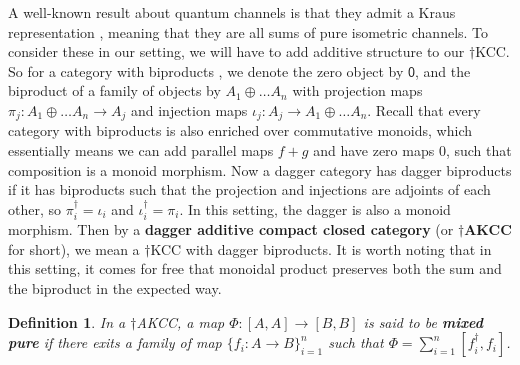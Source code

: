 \documentclass[submission,copyright,creativecommons]{eptcs}
\newtheorem{definition}[observation]{Definition}
\newtheorem{example}[observation]{Example}
\begin{document}
A well-known result about quantum channels is that they admit a Kraus representation \cite[Cor 2.27]{watrous2018theory}, meaning that they are all sums of pure isometric channels. To consider these in our setting, we will have to add additive structure to our $\dagger$KCC. So for a category with biproducts \cite[Sec 6.3]{selinger2010survey}, we denote the zero object by $\mathsf{0}$, and the biproduct of a family of objects by $A_1 \oplus \hdots A_n$ with projection maps $\pi_j: A_1 \oplus \hdots A_n \to A_j$ and injection maps $\iota_j: A_j \to A_1 \oplus \hdots A_n$. Recall that every category with biproducts is also enriched over commutative monoids, which essentially means we can add parallel maps $f+g$ and have zero maps $0$, such that composition is a monoid morphism. Now a dagger category has dagger biproducts \cite[Sec 7.6]{selinger2010survey} if it has biproducts such that the projection and injections are adjoints of each other, so $\pi_i^\dagger=\iota_i$ and $\iota^\dagger_i = \pi_i$. In this setting, the dagger is also a monoid morphism. Then by a \textbf{dagger additive compact closed category} (or \textbf{$\dagger$AKCC} for short), we mean a $\dagger$KCC with dagger biproducts. It is worth noting that in this setting, it comes for free that monoidal product preserves both the sum and the biproduct in the expected way. 




\begin{definition} In a $\dagger$AKCC, a map $\Phi: [A,A] \to [B,B]$ is said to be \textbf{mixed pure} if there exits a family of map $\lbrace f_i: A \to B \rbrace^n_{i=1}$ such that $\Phi = \sum\limits_{i=1}^n [f_i^\dagger,f_i]$. 
\end{definition}
\end{document}
